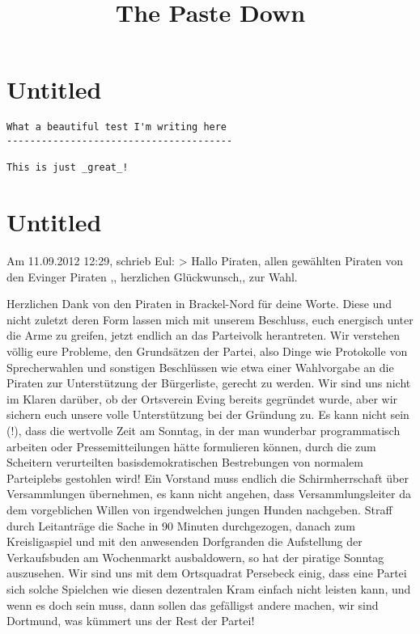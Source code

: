 \documentclass[a1paper]{article}
\title{The Paste Down}
\begin{document}
\maketitle

\thispagestyle{empty}
\pagestyle{empty}

\begin{multicols}{7}{









\section{Untitled}
\begin{verbatim}
What a beautiful test I'm writing here
---------------------------------------

This is just _great_!
\end{verbatim}







\section{Untitled}
Am 11.09.2012 12:29, schrieb Eul:
> Hallo Piraten, allen gewählten Piraten von den Evinger Piraten ,, herzlichen Glückwunsch,, zur Wahl.

Herzlichen Dank von den Piraten in Brackel-Nord für deine Worte. Diese und nicht zuletzt deren Form lassen mich mit unserem Beschluss, euch energisch unter die Arme zu greifen, jetzt endlich an das Parteivolk herantreten. Wir verstehen völlig eure Probleme, den Grundsätzen der Partei, also Dinge wie Protokolle von Sprecherwahlen und sonstigen Beschlüssen wie etwa einer Wahlvorgabe an die Piraten zur Unterstützung der Bürgerliste, gerecht zu werden. Wir sind uns nicht im Klaren darüber, ob der Ortsverein Eving bereits gegründet wurde, aber wir sichern euch unsere volle Unterstützung bei der Gründung zu. Es kann nicht sein (!), dass die wertvolle Zeit am Sonntag, in der man wunderbar programmatisch arbeiten oder Pressemitteilungen hätte formulieren können, durch die zum Scheitern verurteilten basisdemokratischen Bestrebungen von normalem Parteiplebs gestohlen wird! Ein Vorstand muss endlich die Schirmherrschaft über Versammlungen übernehmen, es kann nicht angehen, dass Versammlungsleiter da dem vorgeblichen Willen von irgendwelchen jungen Hunden nachgeben. Straff durch Leitanträge die Sache in 90 Minuten durchgezogen, danach zum Kreisligaspiel und mit den anwesenden Dorfgranden die Aufstellung der Verkaufsbuden am Wochenmarkt ausbaldowern, so hat der piratige Sonntag auszusehen. Wir sind uns mit dem Ortsquadrat Persebeck einig, dass eine Partei sich solche Spielchen wie diesen dezentralen Kram einfach nicht leisten kann, und wenn es doch sein muss, dann sollen das gefälligst andere machen, wir sind Dortmund, was kümmert uns der Rest der Partei!

}
\end{multicols}
\end{document}
